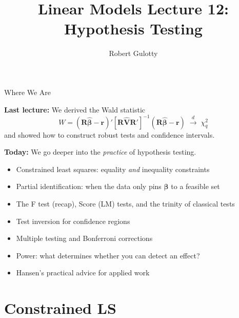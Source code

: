 \documentclass[handout, aspectratio=169]{beamer}
\title[PLSC 30700]{Linear Models Lecture 12: Hypothesis Testing}
\author{Robert Gulotty}
\institute[Chicago]{University of Chicago}
\numberwithin{equation}{section}
\begin{document}
\begin{frame}
\maketitle
\end{frame}

\begin{frame}{Where We Are}

\textbf{Last lecture:} We derived the Wald statistic
$$W = (\bm{R}\hat{\bm{\beta}} - \bm{r})'\left[\bm{R}\hat{\bm{V}}\bm{R}'\right]^{-1}(\bm{R}\hat{\bm{\beta}} - \bm{r}) \;\xrightarrow{d}\; \chi^2_q$$
and showed how to construct robust tests and confidence intervals.

\pause
\bigskip

\textbf{Today:} We go deeper into the \emph{practice} of hypothesis testing.

\begin{itemize}
\item Constrained least squares: equality \emph{and} inequality constraints
\item Partial identification: when the data only pins $\bm{\beta}$ to a feasible set
\item The F test (recap), Score (LM) tests, and the trinity of classical tests
\item Test inversion for confidence regions
\item Multiple testing and Bonferroni corrections
\item Power: what determines whether you can detect an effect?
\item Hansen's practical advice for applied work
\end{itemize}
\end{frame}

\section{Constrained LS}
\setcounter{subsection}{1}
\end{document}
